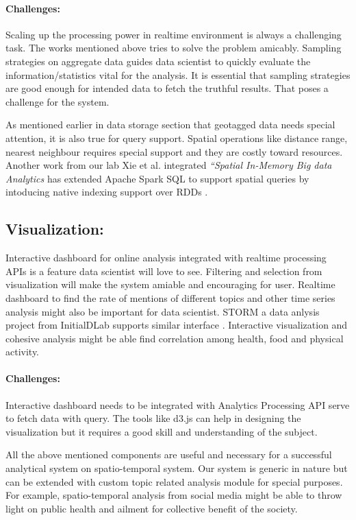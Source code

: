 \vspace{-2mm}
\paragraph{Challenges:}
Scaling up the processing power in realtime environment is always a challenging task. The works mentioned above tries to solve the problem amicably. Sampling strategies on aggregate data guides data scientist to quickly
evaluate the information/statistics vital for the analysis. It is essential that sampling strategies are good enough for intended data to fetch the truthful results. That poses a challenge for the system.

As mentioned earlier in data storage section that geotagged data needs special attention, it is also true for query support.
Spatial operations like distance range, nearest neighbour requires special support and they are costly toward resources. Another work from our lab Xie et al. integrated {\em ``Spatial In-Memory Big data Analytics}  \cite{xie2016simba} has extended Apache Spark SQL to support spatial queries by intoducing native indexing support over RDDs \cite{sparkcitation}.

\subsection{Visualization:}
Interactive dashboard for online analysis integrated with realtime processing APIs is a feature data scientist will love to see. Filtering and selection from visualization will make the system amiable and encouraging for user. Realtime dashboard to find the rate of mentions of different topics and other time series analysis might also be important for data scientist. STORM a data anlysis project from InitialDLab supports similar interface \cite{}. Interactive visualization and cohesive analysis might be able find correlation among health, food and physical activity.

\vspace{-2mm}
\paragraph{Challenges:}
Interactive dashboard needs to be integrated with Analytics Processing API serve to fetch data with query. The tools like d3.js can help in designing the visualization but it requires a good skill and understanding of the subject.


All the above mentioned components are useful and necessary for a successful analytical system on spatio-temporal system. Our system is generic in nature but can be extended with custom topic related analysis module for special purposes. For example, spatio-temporal analysis from social media might be able to throw light on public health and ailment for collective benefit of the society.



